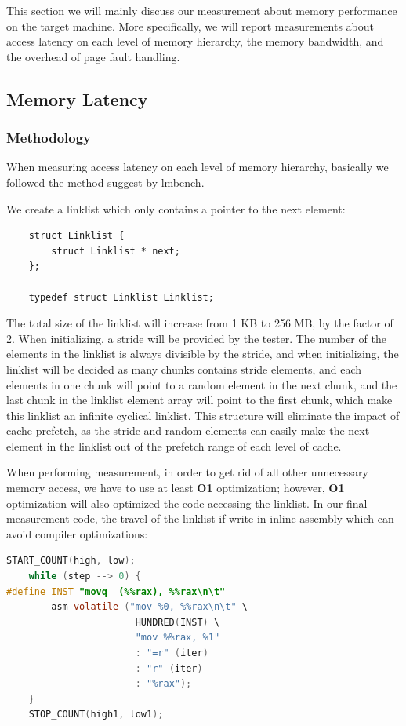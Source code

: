 
% 

This section we will mainly discuss our measurement about memory performance on the target machine. More specifically, we will report measurements about access latency on each level of memory hierarchy, the memory bandwidth, and the overhead of page fault handling.

\subsection{Memory Latency}

\subsubsection{Methodology}

When measuring access latency on each level of memory hierarchy, basically we followed the method suggest by lmbench\cite{mcvoy1996lmbench}.

We create a linklist which only contains a pointer to the next element:

\begin{lstlisting}
    struct Linklist {
        struct Linklist * next;
    };

    typedef struct Linklist Linklist;
\end{lstlisting}

The total size of the linklist will increase from 1 KB to 256 MB, by the factor of 2. When initializing, a stride will be provided by the tester. The number of the elements in the linklist is always divisible by the stride, and when initializing, the linklist will be decided as many chunks contains stride elements, and each elements in one chunk will point to a random element in the next chunk, and the last chunk in the linklist element array will point to the first chunk, which make this linklist an infinite cyclical linklist. This structure will eliminate the impact of cache prefetch, as the stride and random elements can easily make the next element in the linklist out of the prefetch range of each level of cache.

When performing measurement, in order to get rid of all other unnecessary memory access, we have to use at least \textbf{O1} optimization; however, \textbf{O1} optimization will also optimized the code accessing the linklist. In our final measurement code, the travel of the linklist if write in inline assembly which can avoid compiler optimizations:

\begin{lstlisting}[language=C]
    START_COUNT(high, low);
    while (step --> 0) {
#define INST "movq	(%%rax), %%rax\n\t"
        asm volatile ("mov %0, %%rax\n\t" \
                       HUNDRED(INST) \
                       "mov %%rax, %1"
                       : "=r" (iter)
                       : "r" (iter)
                       : "%rax");
    }
    STOP_COUNT(high1, low1);
\end{lstlisting}

